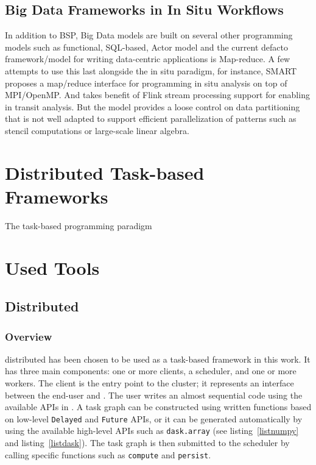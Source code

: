 \subsection{Big Data Frameworks in In Situ Workflows}

In addition to BSP, Big Data models are built on several other programming models such as functional, SQL-based, Actor model and the current defacto framework/model for writing data-centric applications is Map-reduce\cite{Wu2017}. A few attempts to use this last alongside the in situ paradigm, for instance, SMART\cite{wang_smart_2015} proposes a map/reduce interface for programming in situ analysis on top of MPI/OpenMP. And \cite{zanuz_-transit_2018_flink} takes benefit of Flink stream processing support for enabling in transit analysis.
But the model provides a loose control on data partitioning that is not well adapted to support efficient parallelization of patterns such as stencil computations\cite{arrayUDF-SC2018} or large-scale linear algebra.


\section{Distributed Task-based Frameworks}

The task-based programming paradigm 




\section{Used Tools}




\subsection{\dask Distributed}\label{sec:dask.distributed}
\subsubsection{Overview}
\dask distributed has been chosen to be used as a task-based framework in this work.  
It has three main components: one or more clients, a scheduler, and one or more workers. The client is the entry point to the \dask cluster; it represents an interface between the end-user and \dask. 
The user writes an almost sequential code using the available APIs in \dask. A task graph can be constructed using written functions based on low-level \texttt{Delayed} and \texttt{Future} APIs, or it can be generated automatically by using the available high-level APIs such as \texttt{dask.array} (see listing~\ref{listnumpy} and listing~\ref{listdask}). The task graph is then submitted to the scheduler by calling specific functions such as \texttt{compute} and \texttt{persist}.    

